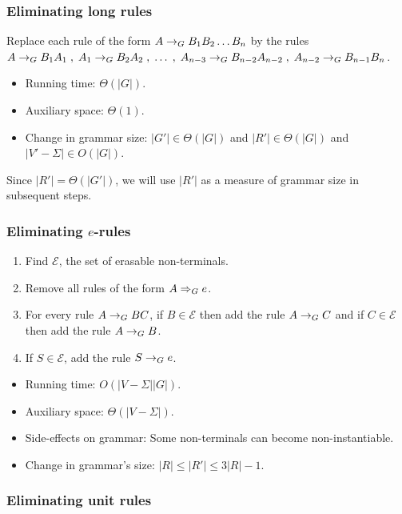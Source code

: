 \subsubsection{Eliminating long rules}

Replace each rule of the form $A \rightarrow_{G} B_1B_2\ldots B_n$ by the rules
$A \rightarrow_{G} B_1A_1 \;,\; A_1 \rightarrow_{G} B_2A_2 \;,\; \ldots \;,\;
A_{n-3} \rightarrow_{G} B_{n-2}A_{n-2} \;,\; A_{n-2} \rightarrow_{G} B_{n-1}B_n$.

\begin{itemize}
\item Running time: $\Theta(|G|)$.
\item Auxiliary space: $\Theta(1)$.
\item Change in grammar size: $|G'| \in \Theta(|G|)$ and $|R'| \in \Theta(|G|)$ and $|V'-\Sigma| \in O(|G|)$.
\end{itemize}

Since $|R'| = \Theta(|G'|)$, we will use $|R'|$ as a measure of grammar size in subsequent steps.

\subsubsection[Eliminating e-rules]{Eliminating $e$-rules}

\begin{enumerate}
\item Find $\mathcal{E}$, the set of erasable non-terminals.
\item Remove all rules of the form $A \Rightarrow_{G} e$.
\item For every rule $A \rightarrow_{G} BC$,
    if $B \in \mathcal{E}$ then add the rule $A \rightarrow_{G} C$
    and if $C \in \mathcal{E}$ then add the rule $A \rightarrow_{G} B$.
\item If $S \in \mathcal{E}$, add the rule $S \rightarrow_{G} e$.
\end{enumerate}

\begin{itemize}
\item Running time: $O(|V-\Sigma||G|)$.
\item Auxiliary space: $\Theta(|V-\Sigma|)$.
\item Side-effects on grammar: Some non-terminals can become non-instantiable.
\item Change in grammar's size: $|R| \le |R'| \le 3|R|-1$.
\end{itemize}

\subsubsection{Eliminating unit rules}


